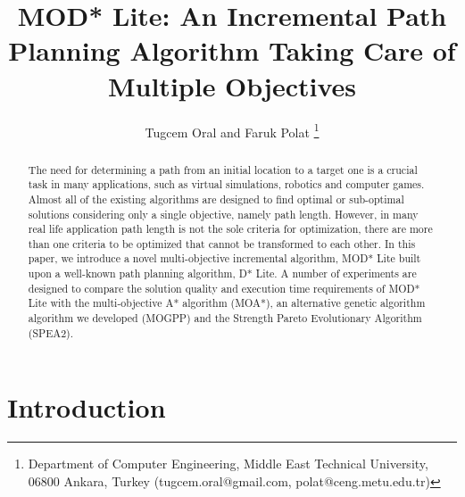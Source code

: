 \documentclass[10pt,journal]{IEEEtran}
\begin{document}
\title{MOD* Lite: An Incremental Path Planning Algorithm Taking Care of Multiple Objectives}

\author{Tugcem Oral and Faruk Polat
\thanks{Department of Computer Engineering, Middle East Technical University, 06800 Ankara, Turkey (tugcem.oral@gmail.com, polat@ceng.metu.edu.tr)}}

\maketitle

\begin{abstract}
The need for determining a path from an initial location to a target one is a crucial task in many applications, such as virtual simulations, robotics and computer games. Almost all of the existing algorithms are designed to find optimal or sub-optimal solutions considering only a single objective, namely path length.  However, in many real life application path length is not the sole criteria for optimization, there are more than one criteria to be optimized that cannot be transformed to each other. In this paper, we introduce  a novel multi-objective incremental algorithm, MOD* Lite built upon a well-known path planning algorithm, D* Lite. A number of experiments are designed to compare the solution quality and execution time requirements of MOD* Lite with the multi-objective A* algorithm (MOA*), an alternative genetic algorithm algorithm we developed (MOGPP) and the Strength Pareto Evolutionary Algorithm (SPEA2).
\end{abstract}

\section{Introduction}
\label{chapter:introduction}
\end{document}
